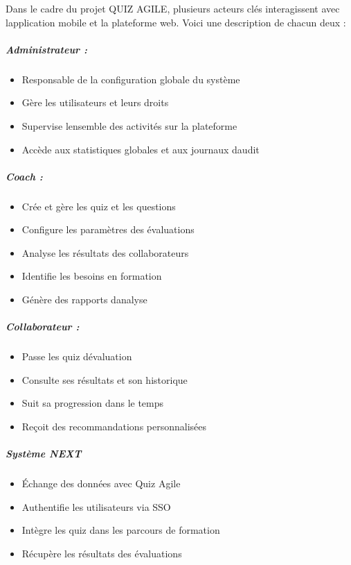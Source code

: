 \documentclass[12pt,a4paper,twoside,openright]{report}
\begin{document}
Dans
le cadre du projet QUIZ AGILE, plusieurs acteurs clés interagissent avec
l\textquotesingle application mobile et la plateforme web. Voici une
description de chacun d\textquotesingle eux :

\hypertarget{administrateur}{%
\subparagraph{Administrateur :}\label{administrateur}}

\begin{itemize}
\item
  Responsable de la configuration globale du système
\item
  Gère les utilisateurs et leurs droits
\item
  Supervise l\textquotesingle ensemble des activités sur la plateforme
\item
  Accède aux statistiques globales et aux journaux
  d\textquotesingle audit
\end{itemize}

\hypertarget{coach}{%
\subparagraph{Coach :}\label{coach}}

\begin{itemize}
\item
  Crée et gère les quiz et les questions
\item
  Configure les paramètres des évaluations
\item
  Analyse les résultats des collaborateurs
\item
  Identifie les besoins en formation
\item
  Génère des rapports d\textquotesingle analyse
\end{itemize}

\hypertarget{collaborateur}{%
\subparagraph{Collaborateur :}\label{collaborateur}}

\begin{itemize}
\item
  Passe les quiz d\textquotesingle évaluation
\item
  Consulte ses résultats et son historique
\item
  Suit sa progression dans le temps
\item
  Reçoit des recommandations personnalisées
\end{itemize}

\hypertarget{systuxe8me-next}{%
\subparagraph{Système NEXT}\label{systuxe8me-next}}

\begin{itemize}
\item
  Échange des données avec Quiz Agile
\item
  Authentifie les utilisateurs via SSO
\item
  Intègre les quiz dans les parcours de formation
\item
  Récupère les résultats des évaluations
\end{itemize}
\end{document}
